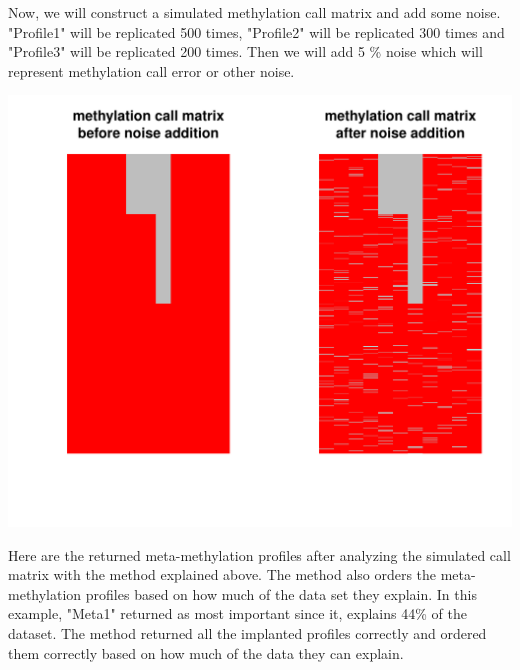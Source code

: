 \documentclass{article}\usepackage[]{graphicx}\usepackage[]{color}
\newenvironment{knitrout}{}{} %
\begin{document}
Now, we will construct a simulated methylation call matrix and add some noise. "Profile1" will
be replicated 500 times, "Profile2" will be replicated 300 times and "Profile3" will
be replicated 200 times. Then we will add 5 \% noise which will represent methylation
call error or other noise.

\begin{knitrout}
\color{fgcolor}

{\centering \includegraphics[width=.9\linewidth]{figure/manual-MetaGenerate} 

}



\end{knitrout}

Here are the returned meta-methylation profiles after analyzing the simulated
call matrix with the method explained above. The method also orders the meta-methylation
profiles based on how much of the data set they explain. In this example,
"Meta1" returned as most important since it, explains 44\% of the dataset. The method
returned all the implanted profiles correctly and ordered them correctly based on
how much of the data they can explain.
\end{document}
